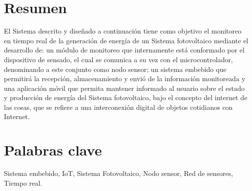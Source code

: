 \section{Resumen}
El Sistema descrito y diseñado a continuación tiene como objetivo el monitoreo en tiempo real de la generación de energía de un Sistema fotovoltaico mediante el desarrollo de: un módulo de monitoreo que internamente está conformado por el dispositivo de sensado, el cual se comunica a su vez con el microcontrolador, denominando a este conjunto como nodo sensor; un sistema embebido que permitirá la recepción, almacenamiento y envió de la información monitoreada y una aplicación móvil que permita mantener informado al usuario sobre el estado y producción de energía  del Sistema fotovoltaico, bajo el concepto del internet de las cosas, que se refiere a una interconexión digital de objetos cotidianos con Internet.

\section{Palabras clave}
Sistema embebido, IoT, Sistema Fotovoltaico, Nodo sensor, Red de sensores, Tiempo real.

